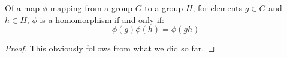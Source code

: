 \begin{definition}
    \label{definition : Homomorphism}
    \leanok
    Of a map \( \phi \) mapping from a group \( G \) to a group \( H \), for
    elements \( g \in G \) and \( h \in H \), \( \phi \) is a homomorphism if and only if:
    \[
        \phi(g)\phi(h) = \phi(gh)
    \]
\end{definition}

\begin{proof}
    \leanok
    \uses{}
    This obviously follows from what we did so far.
\end{proof}


